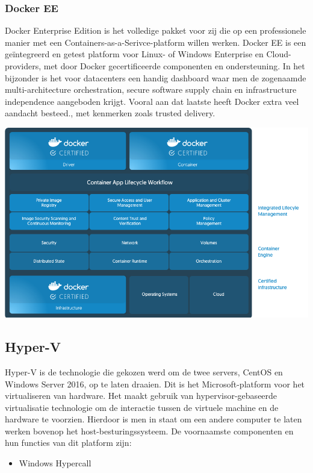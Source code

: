 \subsubsection{Docker EE}
Docker Enterprise Edition is het volledige pakket voor zij die op een professionele manier met een Containers-as-a-Serivce-platform willen werken. Docker EE is een geïntegreerd en getest platform voor Linux- of Windows Enterprise en Cloud-providers, met door Docker gecertificeerde componenten en ondersteuning. In het bijzonder is het voor datacenters een handig dashboard waar men de zogenaamde multi-architecture orchestration, secure software supply chain en infrastructure independence aangeboden krijgt. Vooral aan dat laatste heeft Docker extra veel aandacht besteed., met kenmerken zoals trusted delivery.

\begin{center}
	\includegraphics[scale=0.2]{img/dockerce.png}
\end{center}

\subsection{Hyper-V}
Hyper-V is de technologie die gekozen werd om de twee servers, CentOS en Windows Server 2016, op te laten draaien. Dit is het Microsoft-platform voor het virtualiseren van hardware. Het maakt gebruik van hypervisor-gebaseerde virtualisatie technologie om de interactie tussen de virtuele machine en de hardware te voorzien. Hierdoor is men in staat om een andere computer te laten werken bovenop het host-besturingssysteem. De voornaamste componenten en hun functies van dit platform zijn:

\begin{itemize}[noitemsep]
	\item Windows Hypercall
\end{itemize}

